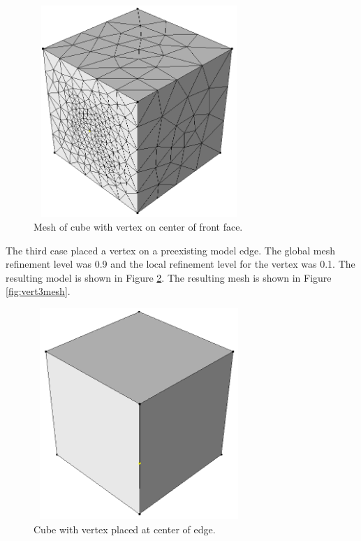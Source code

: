 \documentclass[a4paper, 12pt]{article}
\begin{document}
\begin{figure}[H]
  \centering
  \includegraphics[width=8cm, height=8cm]{test4_sms}
  \caption{Mesh of cube with vertex on center of front face.}
  \label{fig:vert2mesh}
\end{figure}

The third case placed a vertex on a preexisting model edge. The global
mesh refinement level was 0.9 and the local refinement level for the
vertex was 0.1.
The resulting model is shown in Figure \ref{fig:vert3model}.
The resulting mesh is shown in Figure \ref{fig:vert3mesh}.

\begin{figure}[H]
  \centering
  \includegraphics[width=8cm, height=8cm]{test5_smd}
  \caption{Cube with vertex placed at center of edge.}
  \label{fig:vert3model}
\end{figure}
\end{document}
